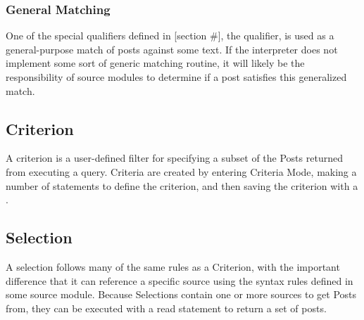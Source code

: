 \subsubsection{General Matching}%
One of the special qualifiers defined in [section \#], the  qualifier, is used as a general-purpose
match of posts against some text. If the interpreter does not implement some sort of generic matching
routine, it will likely be the responsibility of source modules to determine if a post satisfies this
generalized match.

\subsection{Criterion}
A criterion is a user-defined filter for specifying a subset of the Posts returned from executing a query.
Criteria are created by entering Criteria Mode, making a number of statements to define the criterion, and
then saving the criterion with a .

\subsection{Selection}
A selection follows many of the same rules as a Criterion, with the important difference that it can
reference a specific source using the syntax rules defined in some source module. Because Selections
contain one or more sources to get Posts from, they can be executed with a read statement to return a
set of posts.
